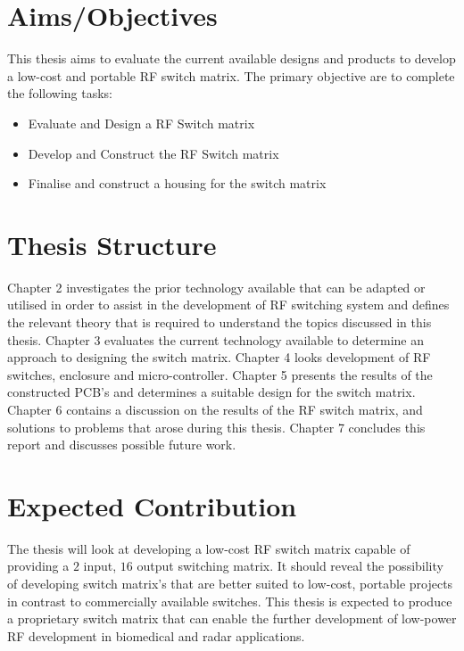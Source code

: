 \documentclass[12pt,openany,a4paper]{book}
\begin{document}
\section{Aims/Objectives}
This thesis aims to evaluate the current available designs and products to develop a low-cost and portable RF switch matrix. \newline
The primary objective are to complete the following tasks: \\[-0.8cm]
\begin{itemize}
	\setlength\itemsep{-0.5em}
	\item Evaluate and Design a RF Switch matrix
	\item Develop and Construct the RF Switch matrix
	\item Finalise and construct a housing for the switch matrix
\end{itemize}



\section{Thesis Structure}
Chapter 2 investigates the prior technology available that can be adapted or utilised in order to assist in the development of RF switching system and defines the relevant theory that is required to understand the topics discussed in this thesis. 
Chapter 3 evaluates the current technology available to determine an approach to designing the switch matrix.
Chapter 4 looks development of RF switches, enclosure and micro-controller. 
Chapter 5 presents the results of the constructed PCB's and determines a suitable design for the switch matrix. 
Chapter 6 contains a discussion on the results of the RF switch matrix, and solutions to problems that arose during this thesis. 
Chapter 7 concludes this report and discusses possible future work.  




\section{Expected Contribution}
The thesis will look at developing a low-cost RF switch matrix capable of providing a $2$ input, $16$ output switching matrix. It should reveal the possibility of developing switch matrix's that are better suited to low-cost, portable projects in contrast to commercially available switches.\newline
This thesis is expected to produce a proprietary switch matrix that can enable the further development of low-power RF development in biomedical and radar applications.
\end{document}
